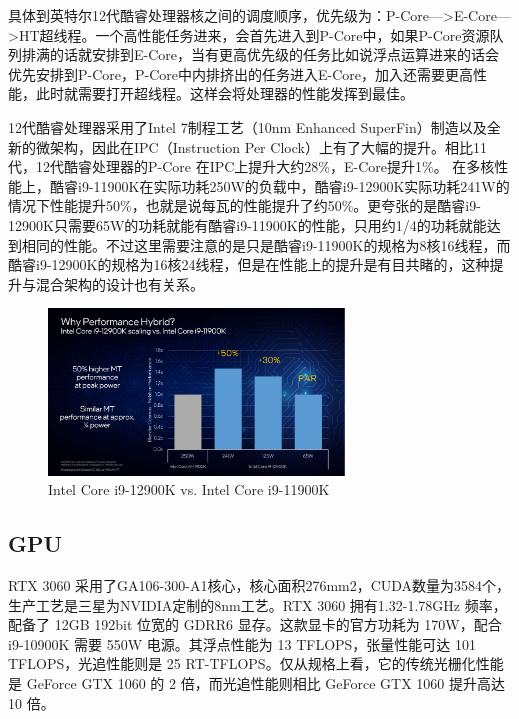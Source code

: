 \documentclass[a4paper]{article}
\begin{document}
具体到英特尔12代酷睿处理器核之间的调度顺序，优先级为：P-Core—>E-Core—>HT超线程。一个高性能任务进来，会首先进入到P-Core中，如果P-Core资源队列排满的话就安排到E-Core，当有更高优先级的任务比如说浮点运算进来的话会优先安排到P-Core，P-Core中内排挤出的任务进入E-Core，加入还需要更高性能，此时就需要打开超线程。这样会将处理器的性能发挥到最佳。

12代酷睿处理器采用了Intel 7制程工艺（10nm Enhanced SuperFin）制造以及全新的微架构，因此在IPC（Instruction Per Clock）上有了大幅的提升。相比11代，12代酷睿处理器的P-Core 在IPC上提升大约28\%，E-Core提升1\%。
在多核性能上，酷睿i9-11900K在实际功耗250W的负载中，酷睿i9-12900K实际功耗241W的情况下性能提升50\%，也就是说每瓦的性能提升了约50\%。更夸张的是酷睿i9-12900K只需要65W的功耗就能有酷睿i9-11900K的性能，只用约1/4的功耗就能达到相同的性能。不过这里需要注意的是只是酷睿i9-11900K的规格为8核16线程，而酷睿i9-12900K的规格为16核24线程，但是在性能上的提升是有目共睹的，这种提升与混合架构的设计也有关系。
\begin{figure}[H] %
\centering %
\includegraphics[width=0.7\textwidth]{12} %
\caption{Intel Core i9-12900K vs. Intel Core i9-11900K} %
\label{Fig.main2} %
\end{figure}

\subsection{GPU}
RTX 3060 采用了GA106-300-A1核心，核心面积276mm2，CUDA数量为3584个，生产工艺是三星为NVIDIA定制的8nm工艺。RTX 3060 拥有1.32-1.78GHz 频率，配备了 12GB 192bit 位宽的 GDRR6 显存。这款显卡的官方功耗为 170W，配合 i9-10900K 需要 550W 电源。其浮点性能为 13 TFLOPS，张量性能可达 101 TFLOPS，光追性能则是 25 RT-TFLOPS。仅从规格上看，它的传统光栅化性能是 GeForce GTX 1060 的 2 倍，而光追性能则相比 GeForce GTX 1060 提升高达 10 倍。
\end{document}
